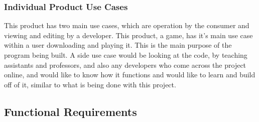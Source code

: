 \documentclass[12pt, titlepage]{article}
\begin{document}
\subsubsection{Individual Product Use Cases}

This product has two main use cases, which are operation by the consumer and viewing and editing by a developer. This product, a game, has it's main use case within a user downloading and playing it. This is the main purpose of the program being built. A side use case would be looking at the code, by teaching assistants and professors, and also any developers who come across the project online, and would like to know how it functions and would like to learn and build off of it, similar to what is being done with this project.

\subsection{Functional Requirements}
\end{document}
